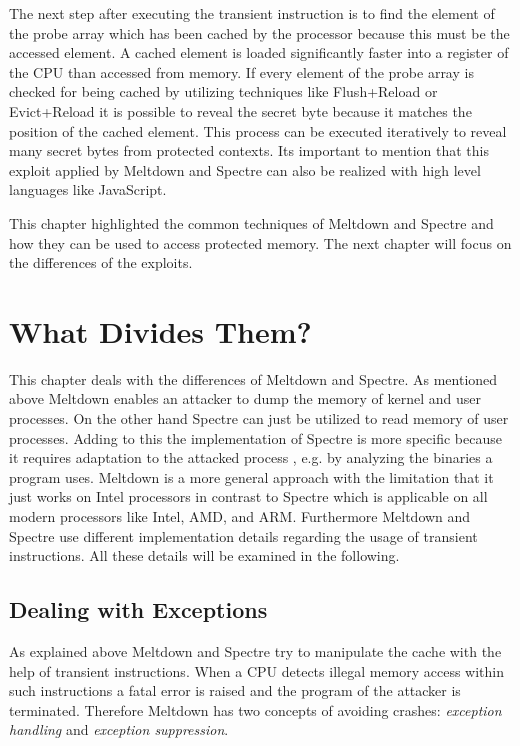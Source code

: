\documentclass[a4paper,oneside,openright] {scrreprt}
\begin{document}
The next step after executing the transient instruction is to find the element of the probe array which has been cached by the processor
because this must be the accessed element.
A cached element is loaded significantly faster into a register of the CPU than accessed from memory.
If every element of the probe array is checked for being cached by utilizing techniques like Flush+Reload or Evict+Reload it is possible
to reveal the secret byte because it matches the position of the cached element.
This process can be executed iteratively to reveal many secret bytes from protected contexts. Its important to mention that this exploit
applied by Meltdown and Spectre can also be realized with high level languages like JavaScript.

This chapter highlighted the common techniques of Meltdown and Spectre and how they can be used to access protected memory.
The next chapter will focus on the differences of the exploits.

\section{What Divides Them?}
\label{ch:intro:motivation}

This chapter deals with the differences of Meltdown and Spectre. As mentioned above Meltdown enables an attacker 
to dump the memory of kernel and user processes. On the other hand Spectre can just be utilized to read memory of user processes.
Adding to this the implementation of Spectre is more specific because it requires adaptation to the attacked process 
, e.g. by analyzing the binaries a program uses. Meltdown is a more general approach with the limitation that it just works on Intel
 processors in contrast to Spectre which is applicable on all modern processors like Intel, AMD, and ARM. Furthermore Meltdown and 
 Spectre use different implementation details regarding the usage of transient instructions. 
 All these details will be examined in the following.

\subsection{Dealing with Exceptions}
\label{ch:intro:motivation:A}

As explained above Meltdown and Spectre try to manipulate the cache with the help of transient instructions. 
When a CPU detects illegal memory access within such instructions a fatal error is raised and the program of the attacker
is terminated. Therefore Meltdown has two concepts of avoiding crashes: \textit{exception handling} and \textit{exception suppression}.
\end{document}
